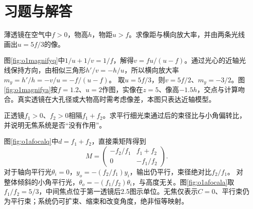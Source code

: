 \section{习题与解答}



\begin{exercise}\label{ex:o1magnification}
薄透镜在空气中$f>0$，物高$h$，物距$u>f$。求像距与横向放大率，并由两条光线画出$u=5f/3$的像。
\end{exercise}
\begin{solution}
图\ref{fig:o1magnifyq}中$1/u+1/v=1/f$，解得$v=fu/(u-f)$。通过光心的近轴光线保持方向，由相似三角形$h'/v=-h/u$，所以横向放大率$m_y=h'/h=-v/u=-f/(u-f)$。
取$u=5f/3$，则$v=5f/2$、$m_y=-3/2$。图\ref{fig:o1magnifya}按$f=1.2$、$u=2$作图，实像在$z=5$、像高$-1.5h$，交点与计算吻合。真实透镜在大孔径或大物高时需考虑像差，本图只表达近轴模型。
\end{solution}

\begin{exercise}\label{ex:o1afocal}
正透镜$f_1>0$、$f_2>0$相隔$f_1+f_2$。求平行细光束通过后的束径比与小角偏转比，并说明无焦系统是否“没有作用”。
\end{exercise}
\begin{solution}
图\ref{fig:o1afocalq}中$d=f_1+f_2$，直接乘矩阵得到
\[
 M=\begin{pmatrix}-f_2/f_1&f_1+f_2\\0&-f_1/f_2\end{pmatrix}.
\]
对于轴向平行光$\theta_i=0$，$y_o=-(f_2/f_1)y_i$，输出仍平行，束径绝对比$f_2/f_1$。
对整体倾斜的小角平行光，$\theta_o=-(f_1/f_2)\theta_i$，与高度无关。图\ref{fig:o1afocala}取$f_1/f_2=5/3$，中间焦点位于第一透镜后2.5图示单位。无焦仅表示$C=0$、平行束仍为平行束；系统仍可扩束、缩束和改变角度，绝非恒等映射。
\end{solution}

